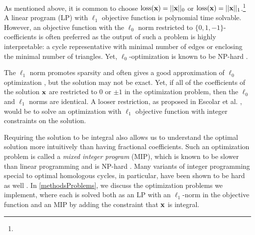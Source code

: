 As mentioned above, it is common to choose $\mathrm{loss}(\mathbf{x}) = ||\mathbf{x}||_0$ or $\mathrm{loss}(\mathbf{x}) = ||\mathbf{x}||_1$.\DIFaddbegin \footnote{} \DIFaddend A linear program (LP) with $\ell_1$ objective function is polynomial time solvable. However, an objective function with the $\ell_0$ norm restricted to $\{0,1,-1\}$-coefficients is often preferred as the output of such a problem is highly interpretable: a cycle representative with minimal number of edges or enclosing the minimal number of triangles. Yet, $\ell_0$-optimization is known to be NP-hard \cite{NPhardL0}. 


The  $\ell_1$ norm promotes sparsity and often gives a good approximation of $\ell_0$ optimization \cite{dohono,NPhardL0}, but the solution may not be exact. Yet, if all of the coefficients of the solution $\mathbf{x}$ are restricted to $0$ or $\pm 1$ in the optimization problem, then the $\ell_0$ and $\ell_1$ norms are identical. A looser restriction, as proposed in Escolar et al. \cite{Escolar2016}, would be to solve an optimization with $\ell_1$ objective function with integer constraints on the solution. 


Requiring the solution to be integral also allows us to understand the optimal solution more intuitively than having fractional coefficients. Such an optimization problem is called a \textit{mixed integer program} (MIP), which is known to be slower than linear programming and is NP-hard \cite{Obayashi2018}. Many variants of integer programming special to optimal homologous cycles, in particular, have been shown to be hard as well \cite{borradaile2020minimum}. In \se \ref{methodsProblems}, we discuss the optimization problems we implement, where each is solved both as an LP with an $\ell_1$-norm in the objective function and an MIP by adding the constraint that $\mathbf{x}$ is integral. 

